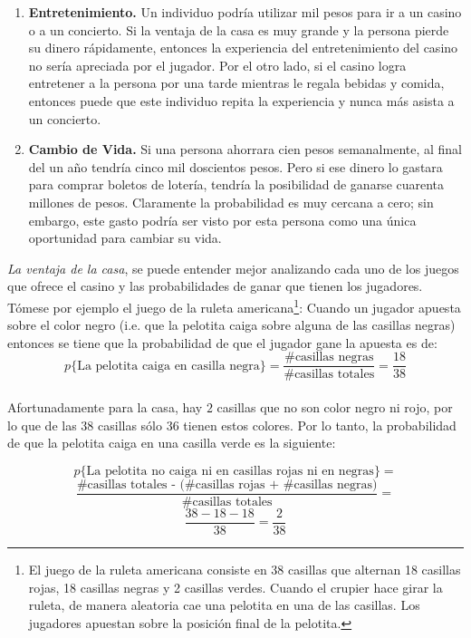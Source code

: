 \begin{enumerate}
	\item \textbf{Entretenimiento.} Un individuo podría utilizar mil pesos para ir a un casino o a un concierto. Si la ventaja de la casa es muy grande y la persona pierde su dinero rápidamente, entonces la experiencia del entretenimiento del casino no sería apreciada por el jugador. Por el otro lado, si el casino logra entretener a la persona por una tarde mientras le regala bebidas y comida, entonces puede que este individuo repita la experiencia y nunca más asista a un concierto.
	\item \textbf{Cambio de Vida.} Si una persona ahorrara cien pesos semanalmente, al final del un año tendría cinco mil doscientos pesos. Pero si ese dinero lo gastara para comprar boletos de lotería, tendría la posibilidad de ganarse cuarenta millones de pesos. Claramente la probabilidad es muy cercana a cero; sin embargo, este gasto podría ser visto por esta persona como una única oportunidad para cambiar su vida.

\end{enumerate}

\emph{La ventaja de la casa}, se puede entender mejor analizando cada uno de los juegos que ofrece el casino y las probabilidades de ganar que tienen los jugadores. Tómese por ejemplo el juego de la ruleta americana\footnote{El juego de la ruleta americana consiste en 38 casillas que alternan 18 casillas rojas, 18 casillas negras y 2 casillas verdes. Cuando el crupier hace girar la ruleta, de manera aleatoria cae una pelotita en una de las casillas. Los jugadores apuestan sobre la posición final de la pelotita.}:
Cuando un jugador apuesta sobre el color negro (i.e. que la pelotita caiga sobre alguna de las casillas negras) entonces se tiene que la probabilidad de que el jugador gane la apuesta es de:\\
\[p\{\text{La pelotita caiga en casilla negra}\} = \frac{\text{\# casillas negras}}{ \text{\# casillas totales}}  = \frac{18}{38}\]\\

Afortunadamente para la casa, hay $2$ casillas que no son color negro ni rojo, por lo que de las $38$ casillas sólo $36$  tienen estos colores. Por lo tanto, la probabilidad de que la pelotita caiga en una casilla verde es la siguiente:

\[p\{\text{La pelotita no caiga ni en casillas rojas ni en negras}\} =\] 
\[\frac{\text{\# casillas totales - (\# casillas rojas + \# casillas negras)}}{ \text{\# casillas totales}}  =\]
\[\frac{38-18-18}{38} = \frac{2}{38}  \]

